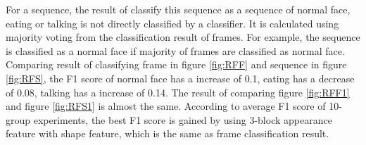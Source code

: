 \newline
For a sequence, the result of classify this sequence as a sequence of normal face, eating or talking is not directly classified by a classifier. It is calculated using majority voting from the classification result of frames. For example, the sequence is classified as a normal face if majority of frames are classified as normal face. Comparing result of classifying frame in figure \ref{fig:RFF} and sequence in figure \ref{fig:RFS}, the F1 score of normal face has a increase of 0.1, eating has a decrease of 0.08, talking has a increase of 0.14. The result of comparing figure \ref{fig:RFF1} and figure \ref{fig:RFS1} is almost the same. According to average F1 score of 10-group experiments, the best F1 score is gained by using 3-block appearance feature with shape feature, which is the same as frame classification result.

